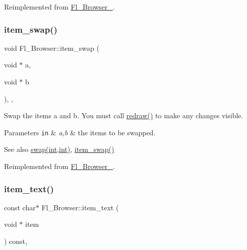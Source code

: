 Reimplemented from \hyperlink{class_fl___browser___a05500ecd3d8da6f429117751829395c7}{Fl\+\_\+\+Browser\+\_\+}.

\mbox{\label{class_fl___browser_aca1943ac78a9dfeee8f76d300dbb398c}} 
\subsubsection{\texorpdfstring{item\+\_\+swap()}{item\_swap()}}
{\footnotesize\ttfamily void Fl\+\_\+\+Browser\+::item\+\_\+swap (\begin{DoxyParamCaption}\item[{void $\ast$}]{a,  }\item[{void $\ast$}]{b }\end{DoxyParamCaption})\hspace{0.3cm}{\ttfamily [inline]}, {\ttfamily [protected]}, {\ttfamily [virtual]}}

Swap the items {\ttfamily a} and {\ttfamily b}. You must call \hyperlink{class_fl___widget_aa63ce68cbf4620cf8750b868368ea02b}{redraw()} to make any changes visible. 
\begin{DoxyParams}[1]{Parameters}
\mbox{\tt in}  & {\em a,b} & the items to be swapped. \\
\hline
\end{DoxyParams}
\begin{DoxySeeAlso}{See also}
\hyperlink{class_fl___browser_a476e8214ed6ca0d6395b588f2cb1e929}{swap(int,int)}, \hyperlink{class_fl___browser_aca1943ac78a9dfeee8f76d300dbb398c}{item\+\_\+swap()} 
\end{DoxySeeAlso}


Reimplemented from \hyperlink{class_fl___browser___a52451c9082450cfb259e9e5b06344387}{Fl\+\_\+\+Browser\+\_\+}.

\mbox{\label{class_fl___browser_add545302a6a8b2a611f6cc4e60475bca}} 
\subsubsection{\texorpdfstring{item\+\_\+text()}{item\_text()}}
{\footnotesize\ttfamily const char$\ast$ Fl\+\_\+\+Browser\+::item\+\_\+text (\begin{DoxyParamCaption}\item[{void $\ast$}]{item }\end{DoxyParamCaption}) const\hspace{0.3cm}{\ttfamily [protected]}, {\ttfamily [virtual]}}


